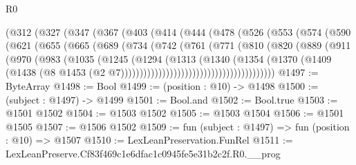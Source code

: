 \begin{lexlean}{R0}
\begin{coremodule}
            (@312
              (@327
                (@347
                  (@367
                    (@403
                      (@414
                        (@444
                          (@478
                            (@526
                              (@553
                                (@574
                                  (@590
                                    (@621
                                      (@655
                                        (@665
                                          (@689
                                            (@734
                                              (@742
                                                (@761
                                                  (@771
                                                    (@810
                                                      (@820
                                                        (@889
                                                          (@911
                                                            (@970
                                                              (@983
                                                                (@1035
                                                                  (@1245
                                                                    (@1294
                                                                      (@1313
                                                                        (@1340
                                                                          (@1354
                                                                            (@1370
                                                                              (@1409
                                                                                (@1438
                                                                                  (@8
                                                                                    @1453
                                                                                    (@2
                                                                                      @7)))))))))))))))))))))))))))))))))))))))))
@1497 := ByteArray
@1498 := Bool
@1499 := (position : @10) -> @1498
@1500 := (subject : @1497) -> @1499
@1501 := Bool.and
@1502 := Bool.true
@1503 := @1501 @1502
@1504 := @1503 @1502
@1505 := @1503 @1504
@1506 := @1501 @1505
@1507 := @1506 @1502
@1509 := fun (subject : @1497) => fun (position : @10) => @1507
@1510 := LexLeanPreservation.FunRel
@1511 := LexLeanPreserve.Cf83f469c1e6dfac1c0945fe5e31b2c2f.R0.__prog

\end{coremodule}
\end{lexlean}
